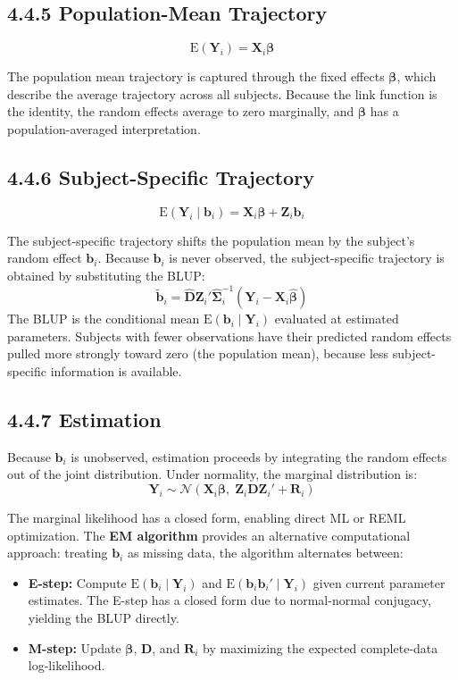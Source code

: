 \documentclass[11pt]{article}
\newcommand{\bY}{\mathbf{Y}}
\newcommand{\bX}{\mathbf{X}}
\newcommand{\bZ}{\mathbf{Z}}
\newcommand{\bbeta}{\boldsymbol{\beta}}
\newcommand{\bSigma}{\boldsymbol{\Sigma}}
\newcommand{\E}{\mathrm{E}}
\newcommand{\Normal}{\mathcal{N}}
\begin{document}
\subsection*{4.4.5 Population-Mean Trajectory}

$$\E(\bY_i) = \bX_i \bbeta$$

The population mean trajectory is captured through the fixed effects $\bbeta$, which describe the average trajectory across all subjects. Because the link function is the identity, the random effects average to zero marginally, and $\bbeta$ has a population-averaged interpretation.

\subsection*{4.4.6 Subject-Specific Trajectory}

$$\E(\bY_i \mid \mathbf{b}_i) = \bX_i \bbeta + \bZ_i \mathbf{b}_i$$

The subject-specific trajectory shifts the population mean by the subject's random effect $\mathbf{b}_i$. Because $\mathbf{b}_i$ is never observed, the subject-specific trajectory is obtained by substituting the BLUP:
$$\tilde{\mathbf{b}}_i = \hat{\mathbf{D}}\bZ_i'\hat{\bSigma}_i^{-1}(\bY_i - \bX_i\hat{\bbeta})$$
The BLUP is the conditional mean $\E(\mathbf{b}_i \mid \bY_i)$ evaluated at estimated parameters. Subjects with fewer observations have their predicted random effects pulled more strongly toward zero (the population mean), because less subject-specific information is available.

\subsection*{4.4.7 Estimation}

Because $\mathbf{b}_i$ is unobserved, estimation proceeds by integrating the random effects out of the joint distribution. Under normality, the marginal distribution is:
$$\bY_i \sim \Normal(\bX_i\bbeta,\; \bZ_i\mathbf{D}\bZ_i' + \mathbf{R}_i)$$

The marginal likelihood has a closed form, enabling direct ML or REML optimization. The \textbf{EM algorithm} provides an alternative computational approach: treating $\mathbf{b}_i$ as missing data, the algorithm alternates between:
\begin{itemize}[leftmargin=2em]
  \item \textbf{E-step:} Compute $\E(\mathbf{b}_i \mid \bY_i)$ and $\E(\mathbf{b}_i\mathbf{b}_i' \mid \bY_i)$ given current parameter estimates. The E-step has a closed form due to normal-normal conjugacy, yielding the BLUP directly.
  \item \textbf{M-step:} Update $\bbeta$, $\mathbf{D}$, and $\mathbf{R}_i$ by maximizing the expected complete-data log-likelihood.
\end{itemize}
\end{document}
